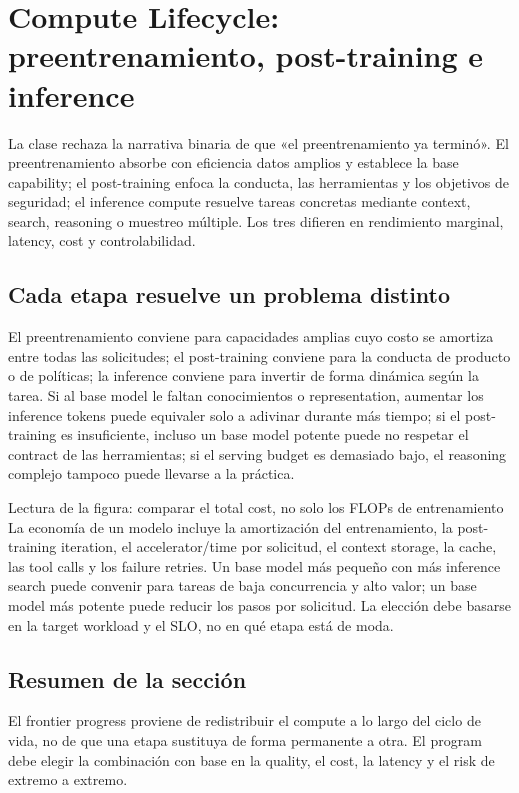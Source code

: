 \section{Compute Lifecycle: preentrenamiento, post-training e inference}

La clase rechaza la narrativa binaria de que «el preentrenamiento ya terminó». El preentrenamiento absorbe con eficiencia datos amplios y establece la base capability; el post-training enfoca la conducta, las herramientas y los objetivos de seguridad; el inference compute resuelve tareas concretas mediante context, search, reasoning o muestreo múltiple. Los tres difieren en rendimiento marginal, latency, cost y controlabilidad.

\subsection{Cada etapa resuelve un problema distinto}

El preentrenamiento conviene para capacidades amplias cuyo costo se amortiza entre todas las solicitudes; el post-training conviene para la conducta de producto o de políticas; la inference conviene para invertir de forma dinámica según la tarea. Si al base model le faltan conocimientos o representation, aumentar los inference tokens puede equivaler solo a adivinar durante más tiempo; si el post-training es insuficiente, incluso un base model potente puede no respetar el contract de las herramientas; si el serving budget es demasiado bajo, el reasoning complejo tampoco puede llevarse a la práctica.


\begin{knowledgebox}{Lectura de la figura: comparar el total cost, no solo los FLOPs de entrenamiento}
La economía de un modelo incluye la amortización del entrenamiento, la post-training iteration, el accelerator/time por solicitud, el context storage, la cache, las tool calls y los failure retries. Un base model más pequeño con más inference search puede convenir para tareas de baja concurrencia y alto valor; un base model más potente puede reducir los pasos por solicitud. La elección debe basarse en la target workload y el SLO, no en qué etapa está de moda.
\end{knowledgebox}

\subsection{Resumen de la sección}

El frontier progress proviene de redistribuir el compute a lo largo del ciclo de vida, no de que una etapa sustituya de forma permanente a otra. El program debe elegir la combinación con base en la quality, el cost, la latency y el risk de extremo a extremo.
